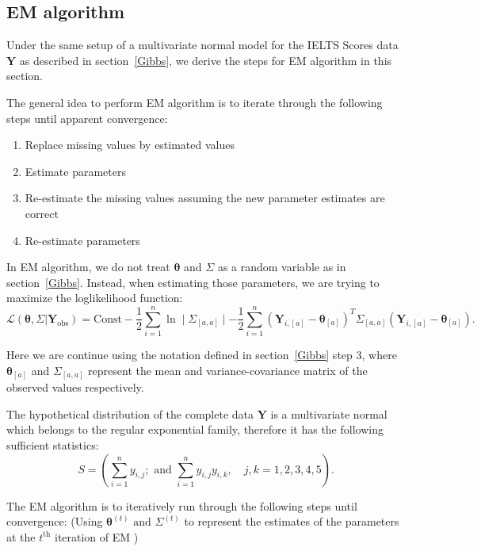 \documentclass[12pt]{article}
\begin{document}
\subsection{EM algorithm}

Under the same setup of a multivariate normal model for the IELTS Scores data $\mathbf{Y}$ as described in section~\ref{Gibbs}, we derive the steps for EM algorithm in this section. 

The general idea to perform EM algorithm is to iterate through the following steps until apparent convergence\cite{Roderick2020}:
\begin{enumerate}
\item Replace missing values by estimated values
\item Estimate parameters 
\item Re-estimate the missing values assuming the new parameter estimates are correct
\item Re-estimate parameters
\end{enumerate}

In EM algorithm, we do not treat $\boldsymbol{\theta}$ and $\Sigma$ as a random variable as in section~\ref{Gibbs}. Instead, when estimating those parameters, we are trying to maximize the loglikelihood function:
\[
\mathcal{L}(\boldsymbol{\theta}, \Sigma|\mathbf{Y}_{\text{obs}}) = \text{Const} - \frac{1}{2}\sum_{i=1}^{n} \ln \mid \Sigma_{[a,a]} \mid -\frac{1}{2}\sum_{i=1}^{n} (\mathbf{Y}_{i,[a]} - \boldsymbol{\theta}_{[a]})^T\Sigma_{[a,a]}(\mathbf{Y}_{i,[a]} - \boldsymbol{\theta}_{[a]})
.\] 

Here we are continue using the notation defined in section~\ref{Gibbs} step 3, where $\boldsymbol{\theta}_{[a]}$ and $\Sigma_{[a,a]}$ represent the mean and variance-covariance matrix of the observed values respectively.

The hypothetical distribution of the complete data $\mathbf{Y}$ is a multivariate normal which belongs to the regular exponential family, therefore it has the following sufficient statistics:
\[
S = \left( \sum_{i=1}^{n} y_{i,j};\text{ and } \sum_{i=1}^{n} y_{i,j}y_{i,k},\quad j,k=1,2,3,4,5\right) 
.\] 

The EM algorithm is to iteratively run through the following steps until convergence: (Using $\boldsymbol{\theta}^{(t)}\text{ and } \Sigma^{(t)}$ to represent the estimates of the parameters at the $t^{\text{th}}$ iteration of EM )
\end{document}
